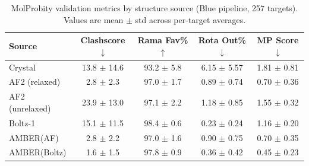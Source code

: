 \begin{table}[htbp]
\centering
\caption{MolProbity validation metrics by structure source (Blue pipeline, 257 targets). Values are mean $\pm$ std across per-target averages.}
\label{tab:molprobity}
\begin{tabular}{lcccc}
\toprule
Source & Clashscore$\downarrow$ & Rama Fav\%$\uparrow$ & Rota Out\%$\downarrow$ & MP Score$\downarrow$ \\
\midrule
  Crystal & 13.8 $\pm$ 14.6 & 93.2 $\pm$ 5.8 & 6.15 $\pm$ 5.57 & 1.81 $\pm$ 0.81 \\
  \midrule
  AF2 (relaxed) & 2.8 $\pm$ 2.3 & 97.0 $\pm$ 1.7 & 0.89 $\pm$ 0.74 & 0.70 $\pm$ 0.36 \\
  AF2 (unrelaxed) & 23.9 $\pm$ 13.0 & 97.1 $\pm$ 2.2 & 1.18 $\pm$ 0.85 & 1.55 $\pm$ 0.32 \\
  Boltz-1 & 15.1 $\pm$ 11.5 & 98.4 $\pm$ 0.6 & 0.23 $\pm$ 0.24 & 1.16 $\pm$ 0.20 \\
  AMBER(AF) & 2.8 $\pm$ 2.2 & 97.0 $\pm$ 1.6 & 0.90 $\pm$ 0.75 & 0.70 $\pm$ 0.35 \\
  AMBER(Boltz) & 1.6 $\pm$ 1.5 & 97.8 $\pm$ 0.9 & 0.36 $\pm$ 0.42 & 0.45 $\pm$ 0.23 \\
\bottomrule
\end{tabular}
\end{table}